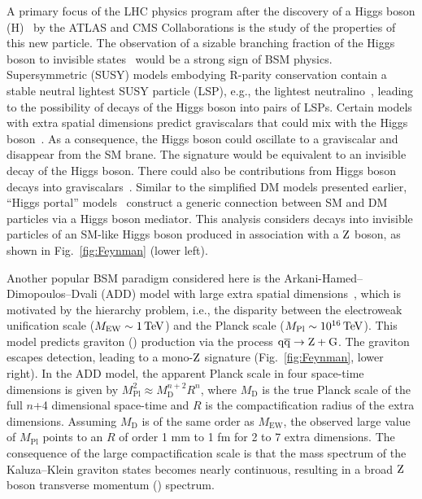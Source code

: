 A primary focus of the LHC physics program after the discovery of a Higgs boson (H)~\cite{AtlasPaperCombination,CMSPaperCombination,Chatrchyan:2013lba} by
the ATLAS and CMS Collaborations is the study of the properties of this new particle. The observation of a sizable branching
fraction of the Higgs boson to invisible states~\cite{Ghosh:2012ep,Martin:1999qf,Bai:2011wz} would be a strong sign
of BSM physics.  Supersymmetric (SUSY) models embodying R-parity conservation contain a stable neutral lightest SUSY
particle (LSP), e.g., the lightest neutralino~\cite{Belanger:2001am}, leading to the possibility of decays of the Higgs boson into pairs of LSPs.
Certain models with extra spatial dimensions predict graviscalars that could mix with the
Higgs boson~\cite{Giudice:2000av}.  As a consequence, the Higgs boson could oscillate
to a graviscalar and disappear from the SM brane. The signature would be
equivalent to an invisible decay of the Higgs boson. There could also be contributions
from Higgs boson decays into graviscalars~\cite{Battaglia:2004js}.
Similar to the simplified DM models presented earlier, ``Higgs portal'' models~\cite{Baek:2012se,Djouadi:2011aa,Djouadi:2012zc} construct a generic connection between SM and DM particles via a Higgs boson mediator.
This analysis considers decays into invisible particles of an SM-like Higgs boson produced in association with a $\mathrm{Z}$ boson, as shown in Fig.~\ref{fig:Feynman} (lower left).

Another popular BSM paradigm considered here is the Arkani-Hamed--Dimopoulos--Dvali (ADD) model with large extra spatial dimensions~\cite{ArkaniHamed:1998rs,ArkaniHamed:1998nn,Han:1998sg}, which
is motivated by the hierarchy problem, i.e., the disparity between the electroweak unification
scale ($M_\mathrm{EW} \sim 1\,\text{Te\hspace{-.08em}V}$) and the Planck scale ($M_\mathrm{Pl} \sim 10^{16}\,\text{Te\hspace{-.08em}V}$).
This model predicts graviton (\cPG) production via the process $\mathrm{q}\overline{\mathrm{q}} \rightarrow \mathrm{Z} + \mathrm{G}$. The graviton escapes
detection, leading to a mono-$\mathrm{Z}$ signature (Fig.~\ref{fig:Feynman}, lower right).
In the ADD model, the apparent Planck scale in four space-time dimensions
is given by $M_\mathrm{Pl}^2 \approx M_\mathrm{D}^{n+2}R^n$, where $M_\mathrm{D}$ is the true Planck scale of
the full $n$+4 dimensional space-time and $R$ is the compactification radius of the extra
dimensions. Assuming $M_\mathrm{D}$ is of the same order as $M_\mathrm{EW}$, the observed large value
of $M_\mathrm{Pl}$ points to an $R$ of order 1 mm to 1 fm for 2 to 7 extra dimensions. The consequence of
the large compactification scale is that the mass spectrum of the Kaluza--Klein graviton states
becomes nearly continuous, resulting in a broad $\mathrm{Z}$ boson transverse momentum (\PT) spectrum.

